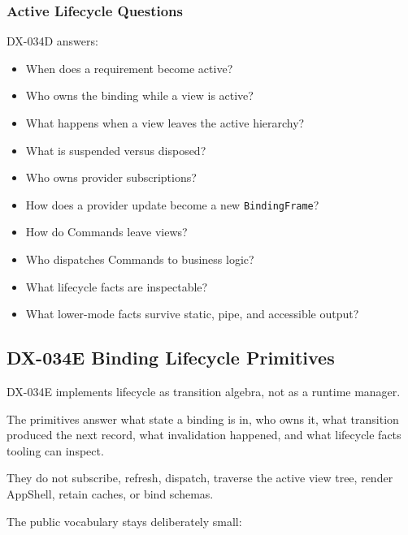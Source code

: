 \subsubsection{Active Lifecycle Questions}\label{record-132-active-lifecycle-questions}

DX-034D answers:

\begin{itemize}
\tightlist
\item
  When does a requirement become active?
\item
  Who owns the binding while a view is active?
\item
  What happens when a view leaves the active hierarchy?
\item
  What is suspended versus disposed?
\item
  Who owns provider subscriptions?
\item
  How does a provider update become a new \texttt{B\allowbreak{}i\allowbreak{}n\allowbreak{}d\allowbreak{}i\allowbreak{}n\allowbreak{}g\allowbreak{}F\allowbreak{}r\allowbreak{}a\allowbreak{}m\allowbreak{}e}?
\item
  How do Commands leave views?
\item
  Who dispatches Commands to business logic?
\item
  What lifecycle facts are inspectable?
\item
  What lower-mode facts survive static, pipe, and accessible output?
\end{itemize}

\subsection{DX-034E Binding Lifecycle Primitives}\label{record-132-dx-034e-binding-lifecycle-primitives}

DX-034E implements lifecycle as transition algebra, not as a runtime manager.

The primitives answer what state a binding is in, who owns it, what transition produced the next record, what invalidation happened, and what lifecycle facts tooling can inspect.

They do not subscribe, refresh, dispatch, traverse the active view tree, render AppShell, retain caches, or bind schemas.

The public vocabulary stays deliberately small:

